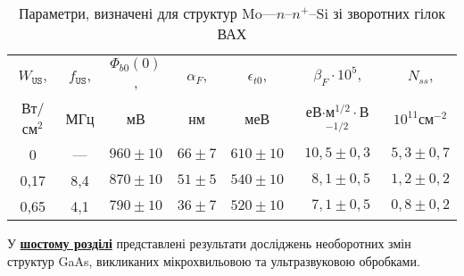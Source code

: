 \begin{table}[hb]
\caption{Параметри, визначені для структур Mo---$n$--$n^+$--Si зі зворотних гілок ВАХ}
\label{tabSDBParZv}
\centering
\begin{tabular}{|c|c|c|c|c|c|c|}
\hline
$W_\mathtt{US}$, &$f_\mathtt{US}$,&$\Phi_{b0}(0)$,&$\alpha_F$,&$\epsilon_{t0}$,&$\beta_F\cdot10^{5}$,&$N_{ss}$,\\
Вт/см$^2$&МГц&мВ&нм&меВ&еВ$\cdot$м$^{1/2}\cdot$В$^{-1/2}$&$10^{11}$см$^{-2}$\\\hline
0&---&$960\pm10$&$66\pm7$&$610\pm10$&$10,5\pm0,3$&$5,3\pm0,7$\\\hline
0,17&8,4&$870\pm10$&$51\pm5$&$540\pm10$&$\;\:8,1\pm0,5$&$1,2\pm0,2$\\\hline
0,65&4,1&$790\pm10$&$36\pm7$&$520\pm10$&$\;\:7,1\pm0,5$&$0,8\pm0,2$\\\hline
\end{tabular}
\end{table}

У  \underline{\textbf{шостому розділі}} представлені результати досліджень необоротних змін
структур GaAs, викликаних мікрохвильовою та ультразвуковою обробками.


